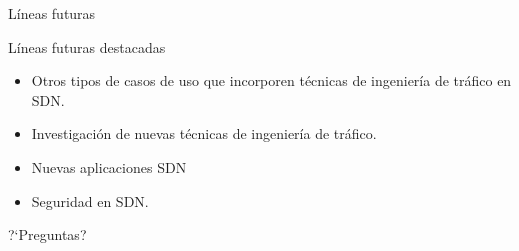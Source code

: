 \documentclass[10pt,spanish,xcolor={svgnames}]{beamer}
\begin{document}
\begin{frame}{Líneas futuras}
\vspace*{-1em}
\large
\begin{alertblock}{\Large Líneas futuras  destacadas}
\vspace*{1em}
\begin{itemize}
\item Otros tipos de casos de uso que incorporen técnicas de ingeniería de tráfico en SDN.
\item Investigación de nuevas técnicas de ingeniería de tráfico.
\item Nuevas aplicaciones  SDN
\item Seguridad en SDN.
\end{itemize}
\end{alertblock}
\end{frame}

\begin{frame}[standout]
\Huge ?`Preguntas?
\end{frame}

 
\end{document}
